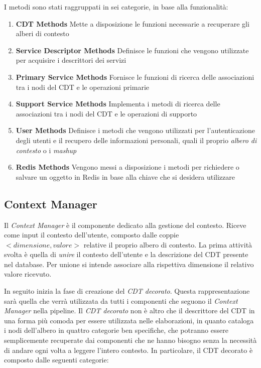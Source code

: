 I metodi sono stati raggruppati in sei categorie, in base alla funzionalità:

\begin{enumerate}
	\item \textbf{CDT Methods} Mette a disposizione le funzioni necessarie a recuperare gli alberi di contesto
	\item \textbf{Service Descriptor Methods} Definisce le funzioni che vengono utilizzate per acquisire i descrittori dei servizi
	\item \textbf{Primary Service Methods} Fornisce le funzioni di ricerca delle associazioni tra i nodi del CDT e le operazioni primarie
	\item \textbf{Support Service Methods} Implementa i metodi di ricerca delle associazioni tra i nodi del CDT e le operazioni di supporto
	\item \textbf{User Methods} Definisce i metodi che vengono utilizzati per l'autenticazione degli utenti e il recupero delle informazioni personali, quali il proprio \emph{albero di contesto} o i \emph{mashup}
	\item \textbf{Redis Methods} Vengono messi a disposizione i metodi per richiedere o salvare un oggetto in Redis in base alla chiave che si desidera utilizzare
\end{enumerate}

\subsection{Context Manager\label{sec:context-manager}}

Il \emph{Context Manager} è il componente dedicato alla gestione del contesto. Riceve come input il contesto dell'utente, composto dalle coppie $ {<}dimensione, valore{>} $ relative il proprio albero di contesto. La prima attività svolta è quella di \emph{unire} il contesto dell'utente e la descrizione del CDT presente nel database. Per unione si intende associare alla rispettiva dimensione il relativo valore ricevuto.

In seguito inizia la fase di creazione del \emph{CDT decorato}. Questa rappresentazione sarà quella che verrà utilizzata da tutti i componenti che seguono il \emph{Context Manager} nella pipeline. Il \emph{CDT decorato} non è altro che il descrittore del CDT in una forma più comoda per essere utilizzata nelle elaborazioni, in quanto cataloga i nodi dell'albero in quattro categorie ben specifiche, che potranno essere semplicemente recuperate dai componenti che ne hanno bisogno senza la necessità di andare ogni volta a leggere l'intero contesto. In particolare, il CDT decorato è composto dalle seguenti categorie:

